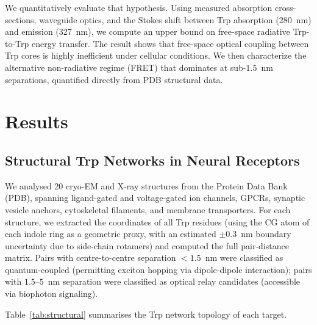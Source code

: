\documentclass[aps,pre,twocolumn,showpacs,superscriptaddress]{revtex4-2}
\begin{document}
We quantitatively evaluate that hypothesis. Using measured absorption cross-sections, waveguide optics, and the Stokes shift between Trp absorption (280~nm) and emission (327~nm), we compute an upper bound on free-space radiative Trp-to-Trp energy transfer. The result shows that free-space optical coupling between Trp cores is highly inefficient under cellular conditions. We then characterize the alternative non-radiative regime (FRET) that dominates at sub-$1.5$~nm separations, quantified directly from PDB structural data.

\section{Results}

\subsection{Structural Trp Networks in Neural Receptors}

We analysed 20 cryo-EM and X-ray structures from the Protein Data Bank (PDB), spanning ligand-gated and voltage-gated ion channels, GPCRs, synaptic vesicle anchors, cytoskeletal filaments, and membrane transporters. For each structure, we extracted the coordinates of all Trp residues (using the CG atom of each indole ring as a geometric proxy, with an estimated $\pm 0.3$~nm boundary uncertainty due to side-chain rotamers) and computed the full pair-distance matrix. Pairs with centre-to-centre separation $< 1.5$~nm were classified as quantum-coupled (permitting exciton hopping via dipole-dipole interaction); pairs with $1.5$--$5$~nm separation were classified as optical relay candidates (accessible via biophoton signaling).

Table~\ref{tab:structural} summarises the Trp network topology of each target.
\end{document}
